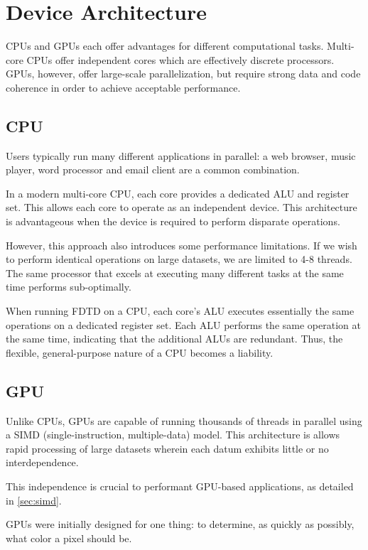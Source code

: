 \chapter{Device Architecture} \label{ch:device architecture}

CPUs and GPUs each offer advantages for different computational tasks. Multi-core CPUs offer independent cores which are effectively discrete processors. GPUs, however, offer large-scale parallelization, but require strong data and code coherence in order to achieve acceptable performance.


\section{CPU}

Users typically run many different applications in parallel: a web browser, music player, word processor and email client are a common combination.

In a modern multi-core CPU, each core provides a dedicated ALU and register set. This allows each core to operate as an independent device. This architecture is advantageous when the device is required to perform disparate operations.

However, this approach also introduces some performance limitations. If we wish to perform identical operations on large datasets, we are limited to 4-8 threads. The same processor that excels at executing many different tasks at the same time performs sub-optimally. 

When running FDTD on a CPU, each core's ALU executes essentially the same operations on a dedicated register set. Each ALU performs the same operation at the same time, indicating that the additional ALUs are redundant. Thus, the flexible, general-purpose nature of a CPU becomes a liability.

\section{GPU}

Unlike CPUs, GPUs are capable of running thousands of threads in parallel using a SIMD (single-instruction, multiple-data) model. This architecture is allows rapid processing of large datasets wherein each datum exhibits little or no interdependence. 

This independence is crucial to performant GPU-based applications, as detailed in \autoref{sec:simd}.


GPUs were initially designed for one thing: to determine, as quickly as possibly, what color a pixel should be. 



